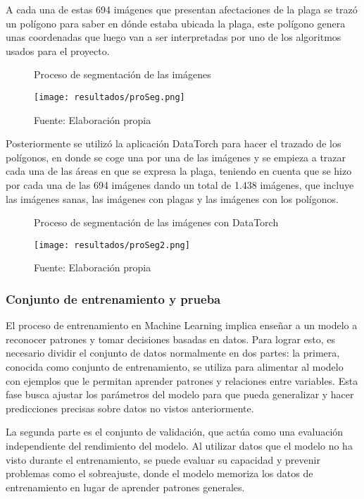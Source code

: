 \newpage

A cada una de estas 694 imágenes que presentan afectaciones de la plaga se trazó un polígono para saber en dónde estaba ubicada la plaga, este polígono genera unas coordenadas que luego van a ser interpretadas por uno de los algoritmos usados para el proyecto.

\begin{figure}[h]
\centering
\caption{Proceso de segmentación de las imágenes}
\texttt{[image: resultados/proSeg.png]}
\caption*{\footnotesize Fuente: Elaboración propia}
\label{fig:figuraProSeg}
\end{figure}

Posteriormente se utilizó la aplicación DataTorch para hacer el trazado de los polígonos, en donde se coge una por una de las imágenes y se empieza a trazar cada una de las áreas en que se expresa la plaga, teniendo en cuenta que se hizo por cada una de las 694 imágenes dando un total de 1.438 imágenes, que incluye las imágenes sanas, las imágenes con plagas y las imágenes con los polígonos.

\begin{figure}[h]
\centering
\caption{Proceso de segmentación de las imágenes con DataTorch}
\texttt{[image: resultados/proSeg2.png]}
\caption*{\footnotesize Fuente: Elaboración propia}
\label{fig:figuraProSegDatatorch}
\end{figure}

\newpage

\subsubsection{Conjunto de entrenamiento y prueba}

El proceso de entrenamiento en Machine Learning implica enseñar a un modelo a reconocer patrones y tomar decisiones basadas en datos. Para lograr esto, es necesario dividir el conjunto de datos normalmente en dos partes: la primera, conocida como conjunto de entrenamiento, se utiliza para alimentar al modelo con ejemplos que le permitan aprender patrones y relaciones entre variables. Esta fase busca ajustar los parámetros del modelo para que pueda generalizar y hacer predicciones precisas sobre datos no vistos anteriormente.

La segunda parte es el conjunto de validación, que actúa como una evaluación independiente del rendimiento del modelo. Al utilizar datos que el modelo no ha visto durante el entrenamiento, se puede evaluar su capacidad y prevenir problemas como el sobreajuste, donde el modelo memoriza los datos de entrenamiento en lugar de aprender patrones generales.


